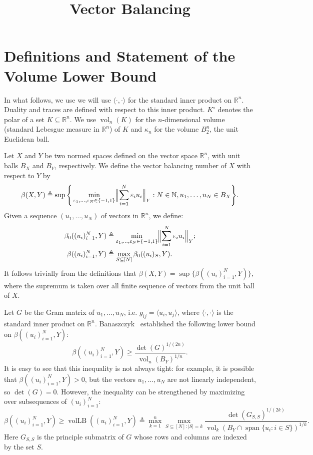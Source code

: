 \documentclass{article}
\newcommand{\R}{{\mathbb{R}}}
\newcommand\eps{\varepsilon}
\newcommand{\eqdef}{\triangleq}
\DeclareMathOperator{\vollb}{volLB}
\DeclareMathOperator{\vol}{vol}
\DeclareMathOperator{\lspan}{span}
\begin{document}
\title{Vector Balancing}
\maketitle

\section{Definitions and Statement of the Volume Lower Bound}

In what follows, we use we will use $\langle \cdot, \cdot \rangle$
for the standard inner product on $\R^n$. Duality and traces are
defined with respect to this inner product. $K^\circ$ denotes the
polar of a set $K \subseteq \R^n$. We use $\vol_n(K)$ for the
$n$-dimensional volume (standard Lebesgue measure in $\R^n$) of $K$ and
$\kappa_n$ for the volume $B_2^n$, the unit Euclidean ball.

Let $X$ and $Y$ be two normed spaces defined on the vector space
$\R^n$, with unit balls $B_X$ and $B_Y$, respectively. We define
the vector balancing number of $X$ with respect to $Y$ by
\[
\beta(X, Y) \eqdef \sup\Bigg\{ 
\min_{\eps_1, \ldots,\eps_N \in \{-1, 1\}} \Bigl\|\sum_{i = 1}^N{\eps_i u_i}\Bigr\|_{Y}: N \in \mathbb{N},
u_1, \ldots, u_N \in B_X\Bigg\}.
\]
Given a sequence $(u_1, \ldots, u_N)$ of vectors in $\R^n$, we define:
\begin{align*}
\beta_0((u_i)_{i = 1}^N,Y) &\eqdef \min_{\eps_1, \ldots,\eps_N \in
  \{-1, 1\}}
\Bigl\|\sum_{i = 1}^N{\eps_i u_i}\Bigr\|_{Y};\\
\beta((u_i)_{i = 1}^N, Y) &\eqdef \max_{S \subseteq  [N]}{\beta_0((u_i)_S, Y)}.
\end{align*}
It follows trivially from the definitions that $\beta(X, Y) =
\sup\{\beta((u_i)_{i = 1}^N, Y)\}$, where the supremum is taken over all
finite sequence of vectors from the unit ball of $X$.

Let $G$ be the Gram matrix of $u_1, \ldots, u_N$, i.e. $g_{ij} =
\langle u_i, u_j \rangle$, where $\langle \cdot, \cdot \rangle$ is
the standard inner product on $\R^n$.  Banaszczyk~\cite{Bana93}
established the following lower bound on $\beta((u_i)_{i = 1}^N, Y)$:
\[
\beta((u_i)_{i = 1}^N, Y) \ge \frac{\det(G)^{1/(2n)}}{\vol_n(B_Y)^{1/n}}.
\]
It is easy to see that this inequality is not always tight: for
example, it is possible that $\beta((u_i)_{i = 1}^N, Y) > 0$, but the
vectors $u_1, \ldots, u_N$ are not linearly independent, so $\det(G) =
0$. However, the inequality can be  strengthened by
maximizing over subsequences of $(u_i)_{i = 1}^N$:
\begin{equation}
  \label{eq:vol-lb}
  \beta((u_i)_{i = 1}^N, Y) \ge \vollb((u_i)_{i = 1}^N, Y) \eqdef
  \max_{k = 1}^n \max_{S \subseteq [N]:|S| = k} \frac{\det(G_{S,S})^{1/(2k)}}{\vol_k(B_Y \cap \lspan\{u_i: i \in S\})^{1/k}}.
\end{equation}
Here $G_{S,S}$ is the principle submatrix of $G$ whose rows and
columns are indexed by the set $S$.
\end{document}
